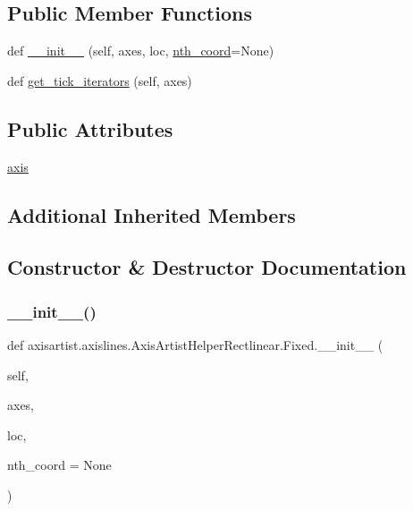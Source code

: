 \subsection*{Public Member Functions}
\begin{DoxyCompactItemize}
\item 
def \hyperlink{classaxisartist_1_1axislines_1_1AxisArtistHelperRectlinear_1_1Fixed_aeee7d5d3d480f57bddf815555cb0c0c0}{\+\_\+\+\_\+init\+\_\+\+\_\+} (self, axes, loc, \hyperlink{classaxisartist_1_1axislines_1_1AxisArtistHelper_1_1Fixed_af95a4c28a2738808b1780bc315216227}{nth\+\_\+coord}=None)
\item 
def \hyperlink{classaxisartist_1_1axislines_1_1AxisArtistHelperRectlinear_1_1Fixed_ab8ae908650210f708bcb059357e59908}{get\+\_\+tick\+\_\+iterators} (self, axes)
\end{DoxyCompactItemize}
\subsection*{Public Attributes}
\begin{DoxyCompactItemize}
\item 
\hyperlink{classaxisartist_1_1axislines_1_1AxisArtistHelperRectlinear_1_1Fixed_ab2af2fcc5efb97d967c49c8879fc6109}{axis}
\end{DoxyCompactItemize}
\subsection*{Additional Inherited Members}


\subsection{Constructor \& Destructor Documentation}
\mbox{\label{classaxisartist_1_1axislines_1_1AxisArtistHelperRectlinear_1_1Fixed_aeee7d5d3d480f57bddf815555cb0c0c0}} 
\subsubsection{\texorpdfstring{\+\_\+\+\_\+init\+\_\+\+\_\+()}{\_\_init\_\_()}}
{\footnotesize\ttfamily def axisartist.\+axislines.\+Axis\+Artist\+Helper\+Rectlinear.\+Fixed.\+\_\+\+\_\+init\+\_\+\+\_\+ (\begin{DoxyParamCaption}\item[{}]{self,  }\item[{}]{axes,  }\item[{}]{loc,  }\item[{}]{nth\+\_\+coord = {\ttfamily None} }\end{DoxyParamCaption})}

